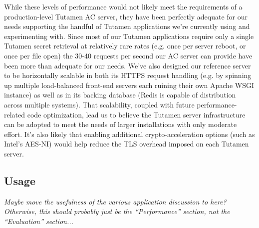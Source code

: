 While these levels of performance would not likely meet the
requirements of a production-level Tutamen AC server, they have been
perfectly adequate for our needs supporting the handful of Tutamen
applications we're currently using and experimenting with. Since most
of our Tutamen applications require only a single Tutamen secret
retrieval at relatively rare rates (e.g. once per server reboot, or
once per file open) the 30-40 requests per second our AC server can
provide have been more than adequate for our needs. We've also
designed our reference server to be horizontally scalable in both its
HTTPS request handling (e.g. by spinning up multiple load-balanced
front-end servers each ruining their own Apache WSGI instance) as well
as in its backing database (Redis is capable of distribution across
multiple systems). That scalability, coupled with future
performance-related code optimization, lead us to believe the Tutamen
server infrastructure can be adopted to meet the needs of larger
installations with only moderate effort. It's also likely that
enabling additional crypto-acceleration options (such as Intel's
AES-NI) would help reduce the TLS overhead imposed on each Tutamen
server.

\subsection{Usage}

{\em Maybe move the usefulness of the various application discussion to
here? Otherwise, this should probably just be the ``Performance''
section, not the ``Evaluation'' section...}

